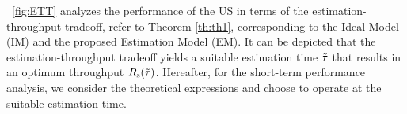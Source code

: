 \figurename~\ref{fig:ETT} analyzes the performance of the US in terms of the estimation-throughput tradeoff, refer to Theorem \ref{th:th1}, corresponding to the Ideal Model (IM) and the proposed Estimation Model (EM). %
It can be depicted that the estimation-throughput tradeoff yields a suitable estimation time $\tilde{\tau}$ that results in an optimum throughput $R_{\text{s}}(\tilde{\tau})$. Hereafter, for the short-term performance analysis, we consider the theoretical expressions and choose to operate at the suitable estimation time. 

\captionsetup[subfigure]{position=top}
\begin{figure}
\centering
{}
\end{figure}
